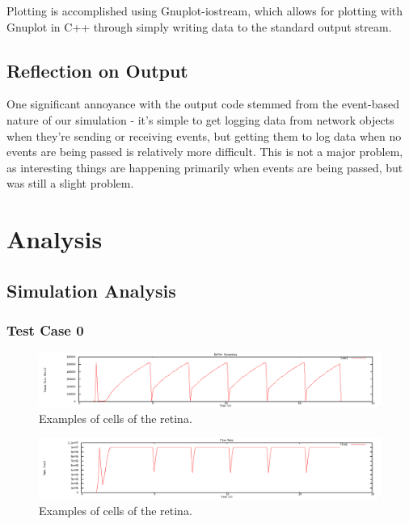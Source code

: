 \documentclass[12pt]{article}
\begin{document}
Plotting is accomplished using Gnuplot-iostream, which allows for plotting with Gnuplot in C++ through simply writing data to the standard output stream.

\subsection*{Reflection on Output}
One significant annoyance with the output code stemmed from the event-based nature of our simulation - it’s simple to get logging data from network objects when they’re sending or receiving events, but getting them to log data when no events are being passed is relatively more difficult. This is not a major problem, as interesting things are happening primarily when events are being passed, but was still a slight problem.


\section{Analysis}


\subsection{Simulation Analysis}
\subsubsection{Test Case 0}

\begin{figure}[t]
\centering \includegraphics[scale=.35]{figures/Test0_Tahoe/buffer_occ.png}
\caption{Examples of cells of the retina.}
\label{fig:test0_tahoe_buffer_occ}
\end{figure}

\begin{figure}[t]
\centering \includegraphics[scale=.35]{figures/Test0_Tahoe/flow_rate.png}
\caption{Examples of cells of the retina.}
\label{fig:test0_tahoe_flow_rate}
\end{figure}
\end{document}
